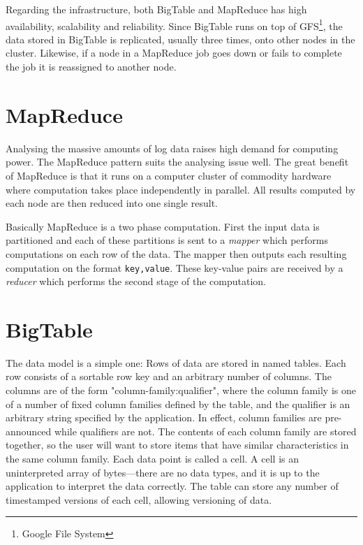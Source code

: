 \documentclass[a4paper,10pt]{book}
\begin{document}
Regarding the infrastructure, both BigTable and MapReduce has high
availability, scalability and reliability. Since BigTable runs on top of
GFS\footnote{Google File System}, the data stored in BigTable is
replicated, usually three times, onto other nodes in the cluster.
\cite{gfs} Likewise, if a node in a MapReduce job goes down or fails to
complete the job it is reassigned to another node. \cite{mapreduce}



\section{MapReduce}

Analysing the massive amounts of log data raises high demand for computing
power. The MapReduce \cite{mapreduce} pattern suits the analysing issue
well. The great benefit of MapReduce is that it runs on a computer cluster
of commodity hardware where computation takes place independently in
parallel. All results computed by each node are then reduced into one
single result.

Basically MapReduce is a two phase computation. First the input data is
partitioned and each of these partitions is sent to a \textit{mapper} which
performs computations on each row of the data. The mapper then outputs each
resulting computation on the format \texttt{key,value}. These key-value
pairs are received by a \textit{reducer} which performs the second stage of
the computation.


\section{BigTable}

The data model is a simple one: Rows of data are stored in named tables.
Each row consists of a sortable row key and an arbitrary number of columns.
The columns are of the form "column-family:qualifier", where the column
family is one of a number of fixed column families defined by the table,
and the qualifier is an arbitrary string specified by the application. In
effect, column families are pre-announced while qualifiers are not. The
contents of each column family are stored together, so the user will want
to store items that have similar characteristics in the same column family.
Each data point is called a cell. A cell is an uninterpreted array of
bytes---there are no data types, and it is up to the application to
interpret the data correctly. The table can store any number of timestamped
versions of each cell, allowing versioning of data.
\end{document}

